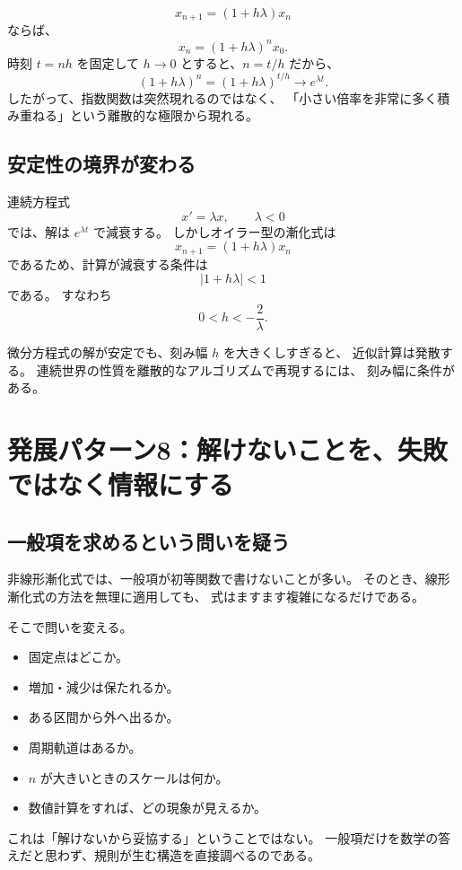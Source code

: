 \[
  x_{n+1}=(1+h\lambda)x_n
\]
ならば、
\[
  x_n=(1+h\lambda)^n x_0.
\]
時刻 $t=nh$ を固定して $h\to0$ とすると、$n=t/h$ だから、
\[
  (1+h\lambda)^n
  =\left(1+h\lambda\right)^{t/h}
  \longrightarrow e^{\lambda t}.
\]
したがって、指数関数は突然現れるのではなく、
「小さい倍率を非常に多く積み重ねる」という離散的な極限から現れる。

\subsection{安定性の境界が変わる}

連続方程式
\[
  x'=\lambda x,\qquad \lambda<0
\]
では、解は $e^{\lambda t}$ で減衰する。
しかしオイラー型の漸化式は
\[
  x_{n+1}=(1+h\lambda)x_n
\]
であるため、計算が減衰する条件は
\[
  |1+h\lambda|<1
\]
である。
すなわち
\[
  0<h<-\frac2\lambda.
\]

微分方程式の解が安定でも、刻み幅 $h$ を大きくしすぎると、
近似計算は発散する。
連続世界の性質を離散的なアルゴリズムで再現するには、
刻み幅に条件がある。

\section{発展パターン8：解けないことを、失敗ではなく情報にする}

\subsection{一般項を求めるという問いを疑う}

非線形漸化式では、一般項が初等関数で書けないことが多い。
そのとき、線形漸化式の方法を無理に適用しても、
式はますます複雑になるだけである。

そこで問いを変える。

\begin{itemize}
  \item 固定点はどこか。
  \item 増加・減少は保たれるか。
  \item ある区間から外へ出るか。
  \item 周期軌道はあるか。
  \item $n$ が大きいときのスケールは何か。
  \item 数値計算をすれば、どの現象が見えるか。
\end{itemize}

これは「解けないから妥協する」ということではない。
一般項だけを数学の答えだと思わず、規則が生む構造を直接調べるのである。

